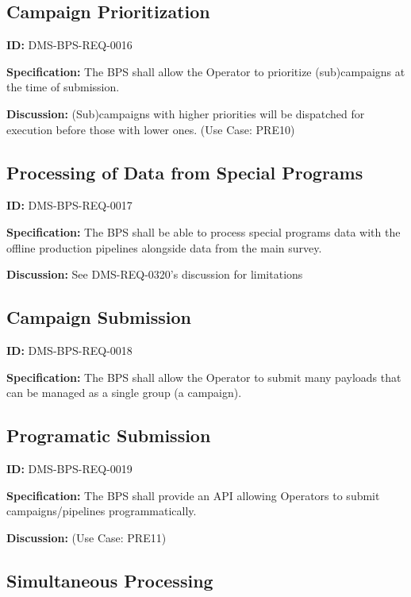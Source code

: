 \documentclass[SE,toc]{lsstdoc}
\begin{document}
\subsection{Campaign Prioritization}

\label{DMS-BPS-REQ-0016}
\textbf{ID:} DMS-BPS-REQ-0016

\textbf{Specification:}
The BPS shall allow the Operator to prioritize (sub)campaigns at the time of submission.

\textbf{Discussion:}
(Sub)campaigns with higher priorities will be dispatched for execution before those with lower ones.  (Use Case: PRE10)

\subsection{Processing of Data from Special Programs}

\label{DMS-BPS-REQ-0017}
\textbf{ID:} DMS-BPS-REQ-0017

\textbf{Specification:}
The BPS shall be able to process special programs data with the offline production pipelines alongside data from the main survey.

\textbf{Discussion:}
See DMS-REQ-0320’s discussion for limitations

\subsection{Campaign Submission}

\label{DMS-BPS-REQ-0018}
\textbf{ID:} DMS-BPS-REQ-0018

\textbf{Specification:}
The BPS shall allow the Operator to submit many payloads that can be managed as a single group (a campaign).

\subsection{Programatic Submission}

\label{DMS-BPS-REQ-0019}
\textbf{ID:} DMS-BPS-REQ-0019

\textbf{Specification:}
The BPS shall provide an API allowing Operators to submit campaigns/pipelines programmatically.

\textbf{Discussion:}
(Use Case: PRE11)

\subsection{Simultaneous Processing}
\end{document}
